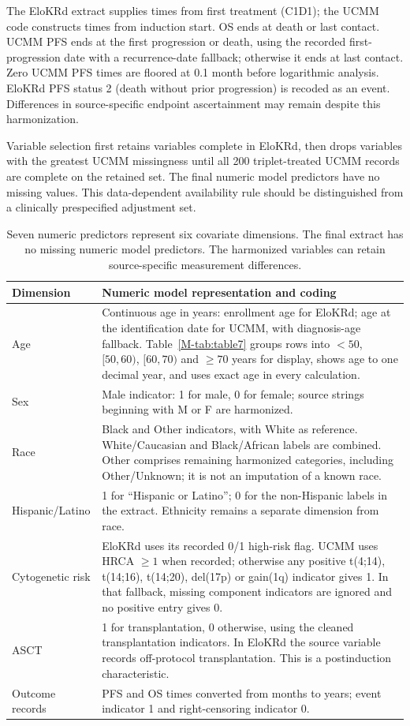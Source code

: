 The EloKRd extract supplies times from first treatment (C1D1); the UCMM code constructs times from induction start. OS ends at death or last contact. UCMM PFS ends at the first progression or death, using the recorded first-progression date with a recurrence-date fallback; otherwise it ends at last contact. Zero UCMM PFS times are floored at 0.1 month before logarithmic analysis. EloKRd PFS status 2 (death without prior progression) is recoded as an event. Differences in source-specific endpoint ascertainment may remain despite this harmonization.

Variable selection first retains variables complete in EloKRd, then drops variables with the greatest UCMM missingness until all 200 triplet-treated UCMM records are complete on the retained set. The final numeric model predictors have no missing values. This data-dependent availability rule should be distinguished from a clinically prespecified adjustment set.

\begin{table}[htbp]
\centering\small
\caption{Harmonized model variables in the myeloma application.}\label{tab:S9}
\begin{tabular}{p{1.3in}p{4.6in}}
\toprule
Dimension & Numeric model representation and coding\\\midrule
Age & Continuous age in years: enrollment age for EloKRd; age at the identification date for UCMM, with diagnosis-age fallback. Table~\ref{M-tab:table7} groups rows into $<50$, $[50,60)$, $[60,70)$ and $\geq70$ years for display, shows age to one decimal year, and uses exact age in every calculation.\\
Sex & Male indicator: 1 for male, 0 for female; source strings beginning with M or F are harmonized.\\
Race & Black and Other indicators, with White as reference. White/Caucasian and Black/African labels are combined. Other comprises remaining harmonized categories, including Other/Unknown; it is not an imputation of a known race.\\
Hispanic/Latino & 1 for ``Hispanic or Latino''; 0 for the non-Hispanic labels in the extract. Ethnicity remains a separate dimension from race.\\
Cytogenetic risk & EloKRd uses its recorded 0/1 high-risk flag. UCMM uses HRCA $\geq1$ when recorded; otherwise any positive t(4;14), t(14;16), t(14;20), del(17p) or gain(1q) indicator gives 1. In that fallback, missing component indicators are ignored and no positive entry gives 0.\\
ASCT & 1 for transplantation, 0 otherwise, using the cleaned transplantation indicators. In EloKRd the source variable records off-protocol transplantation. This is a postinduction characteristic.\\
Outcome records & PFS and OS times converted from months to years; event indicator 1 and right-censoring indicator 0.\\
\bottomrule
\end{tabular}
\caption*{Seven numeric predictors represent six covariate dimensions. The final extract has no missing numeric model predictors. The harmonized variables can retain source-specific measurement differences.}
\end{table}

